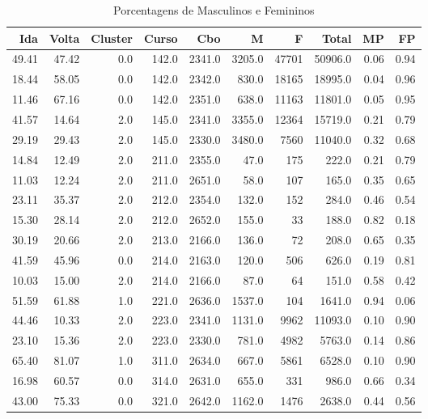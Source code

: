 \begin{table}
\centering
\caption{Porcentagens de Masculinos e Femininos}
\label{tab:Fem_Masc}
\begin{tabular}{rrrrrrrrrr}
\toprule
  Ida &  Volta &  Cluster &  Curso &    Cbo &       M &     F &   Total &   MP &   FP \\
\midrule
49.41 &  47.42 &      0.0 &  142.0 & 2341.0 &  3205.0 & 47701 & 50906.0 & 0.06 & 0.94 \\
18.44 &  58.05 &      0.0 &  142.0 & 2342.0 &   830.0 & 18165 & 18995.0 & 0.04 & 0.96 \\
11.46 &  67.16 &      0.0 &  142.0 & 2351.0 &   638.0 & 11163 & 11801.0 & 0.05 & 0.95 \\
41.57 &  14.64 &      2.0 &  145.0 & 2341.0 &  3355.0 & 12364 & 15719.0 & 0.21 & 0.79 \\
29.19 &  29.43 &      2.0 &  145.0 & 2330.0 &  3480.0 &  7560 & 11040.0 & 0.32 & 0.68 \\
14.84 &  12.49 &      2.0 &  211.0 & 2355.0 &    47.0 &   175 &   222.0 & 0.21 & 0.79 \\
11.03 &  12.24 &      2.0 &  211.0 & 2651.0 &    58.0 &   107 &   165.0 & 0.35 & 0.65 \\
23.11 &  35.37 &      2.0 &  212.0 & 2354.0 &   132.0 &   152 &   284.0 & 0.46 & 0.54 \\
15.30 &  28.14 &      2.0 &  212.0 & 2652.0 &   155.0 &    33 &   188.0 & 0.82 & 0.18 \\
30.19 &  20.66 &      2.0 &  213.0 & 2166.0 &   136.0 &    72 &   208.0 & 0.65 & 0.35 \\
41.59 &  45.96 &      0.0 &  214.0 & 2163.0 &   120.0 &   506 &   626.0 & 0.19 & 0.81 \\
10.03 &  15.00 &      2.0 &  214.0 & 2166.0 &    87.0 &    64 &   151.0 & 0.58 & 0.42 \\
51.59 &  61.88 &      1.0 &  221.0 & 2636.0 &  1537.0 &   104 &  1641.0 & 0.94 & 0.06 \\
44.46 &  10.33 &      2.0 &  223.0 & 2341.0 &  1131.0 &  9962 & 11093.0 & 0.10 & 0.90 \\
23.10 &  15.36 &      2.0 &  223.0 & 2330.0 &   781.0 &  4982 &  5763.0 & 0.14 & 0.86 \\
65.40 &  81.07 &      1.0 &  311.0 & 2634.0 &   667.0 &  5861 &  6528.0 & 0.10 & 0.90 \\
16.98 &  60.57 &      0.0 &  314.0 & 2631.0 &   655.0 &   331 &   986.0 & 0.66 & 0.34 \\
43.00 &  75.33 &      0.0 &  321.0 & 2642.0 &  1162.0 &  1476 &  2638.0 & 0.44 & 0.56 \\

\end{tabular}
\end{table}
